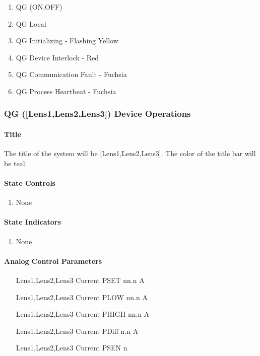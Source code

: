 \documentclass[11pt]{book}		%
\begin{document}
\begin{enumerate}
 \item QG (ON,OFF)
 \item QG Local
 \item QG Initializing - Flashing Yellow
 \item QG Device Interlock - Red
 \item QG Communication Fault - Fuchsia
 \item QG Process Heartbeat - Fuchsia
\end{enumerate}

\subsubsection{QG ([Lens1,Lens2,Lens3]) Device Operations} \label{sect:cyc-op-interface-ops-terminal-device-ops-q1}

\paragraph{Title} \label{sect:cyc-op-interface-ops-terminal-device-ops-q1-title}

The title of the system will be [Lens1,Lens2,Lens3].  The color of the title bar will be teal.

\paragraph{State Controls}

\begin{enumerate}
\item None
\end{enumerate}

\paragraph{State Indicators}

\begin{enumerate}
 \item None
\end{enumerate}

\paragraph{Analog Control Parameters}

\begin{enumerate}
 \item [Lens1,Lens2,Lens3] Current PSET   nn.n A
 \item [Lens1,Lens2,Lens3] Current PLOW   nn.n A
 \item [Lens1,Lens2,Lens3] Current PHIGH  nn.n A
 \item [Lens1,Lens2,Lens3] Current PDiff n.n A
 \item [Lens1,Lens2,Lens3] Current PSEN  n
\end{enumerate}
\end{document}
